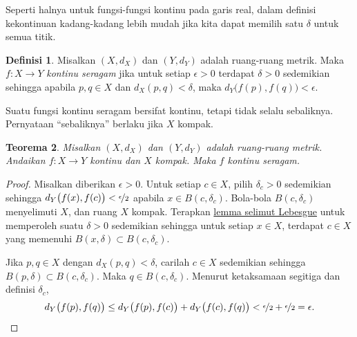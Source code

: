 \documentclass[12pt,openany]{book}
\newcommand{\myquote}[1]{``#1''}
\theoremstyle{plain}
\newtheorem{thm}{Teorema}[section]
\theoremstyle{remark}
\theoremstyle{definition}
\newtheorem{defn}[thm]{Definisi}
\theoremstyle{exercise}
\theoremstyle{example}
\begin{document}
Seperti halnya untuk fungsi-fungsi kontinu
pada garis real, dalam definisi kekontinuan
kadang-kadang lebih mudah jika kita dapat memilih
satu $\delta$ untuk semua titik.

\begin{defn}
Misalkan $(X,d_X)$ dan $(Y,d_Y)$ adalah ruang-ruang metrik.
Maka $f \colon X \to Y$
\emph{kontinu seragam}
jika untuk setiap $\epsilon > 0$
terdapat $\delta > 0$ sedemikian sehingga apabila $p,q \in X$ dan $d_X(p,q) <
\delta$, maka
$d_Y\bigl(f(p),f(q)\bigr) < \epsilon$.
\end{defn}

Suatu fungsi kontinu seragam bersifat kontinu, tetapi tidak selalu
sebaliknya.  Pernyataan \myquote{sebaliknya} berlaku jika $X$ kompak.

\begin{thm} \label{thm:Xcompactfunifcont}
Misalkan $(X,d_X)$ dan $(Y,d_Y)$ adalah ruang-ruang metrik.
Andaikan $f \colon X \to Y$ kontinu dan $X$ kompak.  Maka
$f$ kontinu seragam.
\end{thm}

\begin{proof}
Misalkan diberikan $\epsilon > 0$.  Untuk setiap $c \in X$, pilih $\delta_c > 0$ sedemikian sehingga
$d_Y\bigl(f(x),f(c)\bigr) < \nicefrac{\epsilon}{2}$
apabila
$x \in B(c,\delta_c)$.
Bola-bola
$B(c,\delta_c)$ menyelimuti $X$, dan ruang $X$ kompak.  
Terapkan \hyperref[ms:lebesgue]{lemma selimut Lebesgue} untuk memperoleh suatu 
$\delta > 0$ sedemikian sehingga untuk setiap $x \in X$, terdapat $c \in X$
yang memenuhi $B(x,\delta) \subset B(c,\delta_c)$.

Jika $p, q \in X$ dengan $d_X(p,q) < \delta$,
carilah $c \in X$ sedemikian sehingga $B(p,\delta) \subset B(c,\delta_c)$.
Maka $q \in B(c,\delta_c)$.  Menurut ketaksamaan segitiga
dan definisi $\delta_c$,
\begin{equation*}
d_Y\bigl(f(p),f(q)\bigr)
\leq
d_Y\bigl(f(p),f(c)\bigr)
+
d_Y\bigl(f(c),f(q)\bigr)
<
\nicefrac{\epsilon}{2}+
\nicefrac{\epsilon}{2} = \epsilon .  \qedhere
\end{equation*}
\end{proof}
\end{document}
